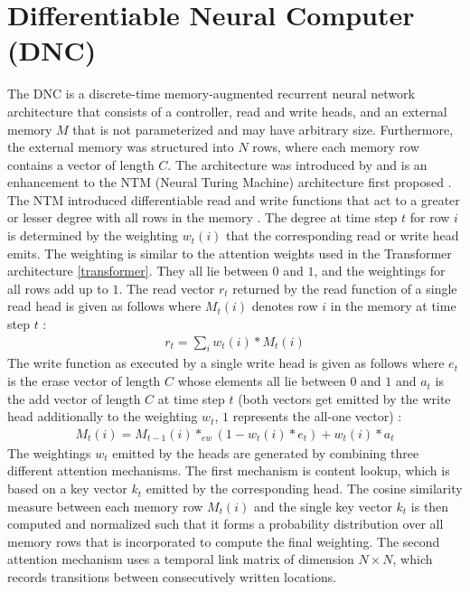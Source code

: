 \documentclass[draft,final]{vutinfth} %
\begin{document}
\section{Differentiable Neural Computer (DNC)} \label{dnc}
The DNC is a discrete-time memory-augmented recurrent neural network architecture that consists of a controller, read and write heads, and an external memory $M$ that is not parameterized and may have arbitrary size.
Furthermore, the external memory was structured into $N$ rows, where each memory row contains a vector of length $C$.
The architecture was introduced by \cite{DNC} and is an enhancement to the NTM (Neural Turing Machine) architecture first proposed \cite{NTM}.
The NTM introduced differentiable read and write functions that act to a greater or lesser degree with all rows in the memory \cite[p. 5]{NTM}.
The degree at time step $t$ for row $i$ is determined by the weighting $w_t(i)$ that the corresponding read or write head emits.
The weighting is similar to the attention weights used in the Transformer architecture \ref{transformer}. They all lie between $0$ and $1$, and the weightings for all rows add up to $1$.
The read vector $r_t$ returned by the read function of a single read head is given as follows where $M_t(i)$ denotes row $i$ in the memory at time step $t$ \cite[p. 1]{DNC}:
\begin{align}
\label{dnc_read}
r_t = \sum_i{w_t(i) * M_t(i)}
\end{align}
The write function as executed by a single write head is given as follows where $e_t$ is the erase vector of length $C$ whose elements all lie between $0$ and $1$ and $a_t$ is the add vector of length $C$ at time step $t$ (both vectors get emitted by the write head additionally to the weighting $w_t$, $1$ represents the all-one vector) \cite[p. 1]{DNC}:
\begin{align}
\label{dnc_write}
M_t(i) = M_{t-1}(i) *_{ew} (1 - w_t(i) * e_t) + w_t(i) * a_t
\end{align}
The weightings $w_t$ emitted by the heads are generated by combining three different attention mechanisms.
The first mechanism is content lookup, which is based on a key vector $k_t$ emitted by the corresponding head.
The cosine similarity measure between each memory row $M_t(i)$ and the single key vector $k_t$ is then computed and normalized such that it forms a probability distribution over all memory rows that is incorporated to compute the final weighting.
The second attention mechanism uses a temporal link matrix of dimension $N \times N$, which records transitions between consecutively written locations.
\end{document}
